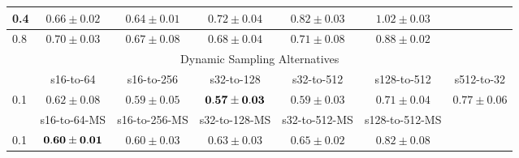 \documentclass[10pt,journal,compsoc]{IEEEtran}
\begin{document}
\begin{table*}[!htbp]
\begin{center}
{\begin{tabular}{|l|c|c|c|c|c|c|}
\hline
0.4   & $0.66\pm0.02$ & $0.64\pm0.01$ & $0.72\pm0.04$ & $0.82\pm0.03$ & $1.02\pm0.03$ &  \\
\hline
0.8   & $0.70\pm0.03$ & $0.67\pm0.08$ & $0.68\pm0.04$ & $0.71\pm0.08$ & $0.88\pm0.02$ &  \\
\hline
\multicolumn{7}{|c|}{Dynamic Sampling Alternatives}\\
\hline
& s16-to-64 & s16-to-256  & s32-to-128 & s32-to-512 & s128-to-512 & s512-to-32 \\
\hline
0.1  & $0.62\pm0.08$ & $0.59\pm0.05$ & $\bf 0.57\pm0.03$ &  $0.59\pm0.03$ & $0.71\pm0.04$ & $0.77\pm0.06$ \\
\hline
& s16-to-64-MS & s16-to-256-MS & s32-to-128-MS & s32-to-512-MS & s128-to-512-MS & \\
\hline
0.1  & $\bf 0.60\pm0.01$ & $0.60\pm0.03$ & $0.63\pm0.03$ &  $0.65\pm0.02$ & $0.82\pm0.08$ &  \\
\hline
\end{tabular}}
\end{center}
\end{table*}
\end{document}
